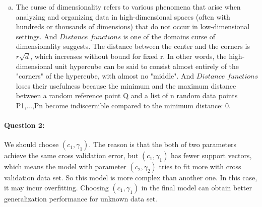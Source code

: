 \documentclass[letterpaper,11pt]{article}
\begin{document}
\begin{enumerate}[(a)]
\begin{enumerate}[(1)]
\end{enumerate}
\item \begin{enumerate}[(1)]
The curse of dimensionality refers to various phenomena that arise when analyzing and organizing data in high-dimensional spaces (often with hundreds or thousands of dimensions) that do not occur in low-dimensional settings. And $Distance$ $functions$ is one of the domains curse of dimensionality suggests. The distance between the center and the corners is $r\sqrt{d}$, which increases without bound for fixed r. In other words, the high-dimensional unit hypercube can be said to consist almost entirely of the "corners" of the hypercube, with almost no "middle". And $Distance$ $functions$ loses their usefulness because the minimum and the maximum distance between a random reference point Q and a list of n random data points P1,...,Pn become indiscernible compared to the minimum distance: 0.
\end{enumerate}
\end{enumerate}

\paragraph{Question 2:}
We should choose $(c_1,\gamma_1)$. The reason is that the both of two parameters achieve the same cross validation error, but $(c_1,\gamma_1)$ has fewer support vectors, which means the model with parameter $(c_2,\gamma_2)$ tries to fit more with cross validation data set. So this model is more complex than another one. In this case, it may incur overfitting. Choosing $(c_1,\gamma_1)$ in the final model can obtain better generalization performance for unknown data set.
\end{document}
